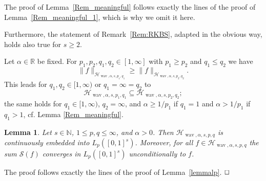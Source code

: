 \documentclass[12pt]{article}
\DeclareMathOperator{\wav}{wav}
\newtheorem{lemma}{Lemma}
\newenvironment{proof}{\begin{trivlist}
    \item[\hskip\labelsep{\it Proof.}]}{$\hfill\Box$\end{trivlist}}
\newcommand{\RR}{\mathbb{R}}
\newcommand{\HH}{\mathcal{H}}
\newcommand{\N}{\mathbb{N}}
\newcommand{\red}[1]{\textcolor{red}{#1}}
\begin{document}
The proof of Lemma~\ref{Rem_meaningful} follows exactly the lines of the proof of Lemma~\ref{Rem_meaningful_1}, which is why we omit it here. 

Furthermore, the statement of Remark~\ref{Rem:RKBS}, adapted in the obvious way, holds also true for $s\ge 2$.

Let $\alpha \in\RR$ be fixed. For  $p_1, p_2, q_1,q_2\in [1,\infty]$ with $p_1\ge p_2$ and $q_1\le q_2$ we have 
\begin{equation*}
\|f\|_{\HH_{\wav,\alpha, s, p_1,q_1}} \ge  \|f\|_{\HH_{\wav,\alpha,s, p_2 ,q_2}}.
\end{equation*}
This leads for  $q_1,q_2\in [1,\infty)$ or $q_1=\infty =q_2$ to
\begin{equation*}
\HH_{\wav,\alpha, s, p_1,q_1} \subseteq \HH_{\wav,\alpha, s, p_2 ,q_2};
\end{equation*}
the same holds for $q_1\in [1,\infty)$, $q_2=\infty$, and $\alpha \ge 1/ p_1$ if $q_1=1$ and  $\alpha >1/ p_1$ if $q_1>1$, cf. Lemma \ref{Rem_meaningful}.


\begin{lemma}\label{lemmalp_multivariate}
Let $s\in \N$, $1\le p,q \le \infty$, and $\alpha >0$.
Then $\mathcal{H}_{\wav,\alpha,s,p,q}$ is continuously embedded into $L_p ([0,1]^s)$.
Moreover, for all $f\in \mathcal{H}_{\wav,\alpha,s,p,q}$ the sum $\mathcal{S}(f)$ converges in 
$L_p ([0,1]^s)$ unconditionally to $f$.
\end{lemma}

\begin{proof}
The proof follows exactly the lines of the proof of Lemma~\ref{lemmalp}.
\end{proof}
\end{document}
